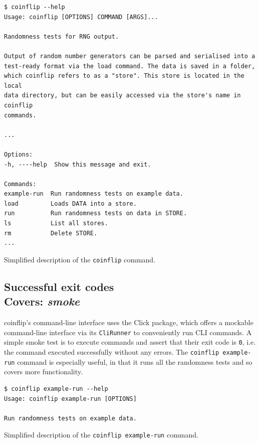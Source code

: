 \documentclass[11pt]{article}
\begin{document}
\begin{listing}[htbp]
  \begin{verbatim}
$ coinflip --help
Usage: coinflip [OPTIONS] COMMAND [ARGS]...

Randomness tests for RNG output.

Output of random number generators can be parsed and serialised into a
test-ready format via the load command. The data is saved in a folder,
which coinflip refers to as a "store". This store is located in the local
data directory, but can be easily accessed via the store's name in coinflip
commands.

...

Options:
-h, ----help  Show this message and exit.

Commands:
example-run  Run randomness tests on example data.
load         Loads DATA into a store.
run          Run randomness tests on data in STORE.
ls           List all stores.
rm           Delete STORE.
...
  \end{verbatim}
  \caption[\texttt{conflip} command description]{Simplified description of the \texttt{coinflip} command.}
\end{listing}

\subsection[Successful exits]{Successful exit codes\\ \small{Covers: \emph{smoke}}}
\label{sec:smoke}

coinflip's command-line interface uses the Click \cite{click} package, which offers a mockable command-line interface via its \texttt{CliRunner} to conveniently run CLI commands. A simple smoke test is to execute commands and assert that their exit code is \texttt{0}, i.e. the command executed successfully without any errors. The \texttt{coinflip example-run} command is especially useful, in that it runs all the randomness tests and so covers more functionality.

\begin{listing}[htbp]
  \begin{verbatim}
$ coinflip example-run --help
Usage: coinflip example-run [OPTIONS]

Run randomness tests on example data.
  \end{verbatim}
  \caption{Simplified description of the \texttt{coinflip example-run} command.}
\end{listing}
\end{document}
